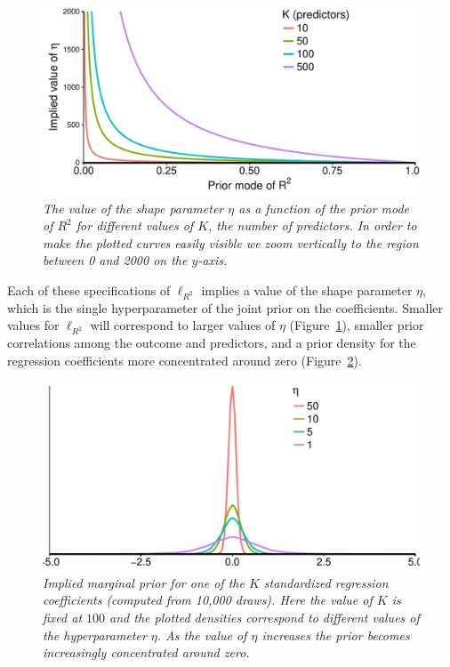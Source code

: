 \documentclass[11pt]{article}
\newcommand{\locRsq}{\ell_{R^2}}
\begin{document}
\begin{figure}
\centering
\includegraphics[width=.67\textwidth]{eta_vs_location_plot.pdf}{\vspace{-.25cm}}
\caption{\em \small The value of the shape parameter $\eta$ as a function of
the prior mode of $R^2$ for different values of $K$, the number of predictors.
In order to make the plotted curves easily visible we zoom vertically to the
region between 0 and 2000 on the $y$-axis.}
\label{fig:etavslocplot}
\end{figure}

Each of these specifications of $\locRsq$ implies a value of the shape parameter
$\eta$, which is the single hyperparameter of the joint prior on the
coefficients. Smaller values for $\locRsq$ will correspond to larger values of
$\eta$ (Figure~\ref{fig:etavslocplot}), smaller prior correlations among the
outcome and predictors, and a prior density for the regression coefficients more
concentrated around zero (Figure~\ref{fig:betaplot}).

\begin{figure}
\centering
\includegraphics[width=.67\textwidth]{betaplot.pdf}{\vspace{-.25cm}}
\caption{\em \small Implied marginal prior for one of the $K$ standardized
regression coefficients (computed from 10,000 draws). Here the value of $K$ is
fixed at $100$ and the plotted densities correspond to different values of the
hyperparameter $\eta$. As the value of $\eta$ increases the prior becomes
increasingly concentrated around zero.}
\label{fig:betaplot}
\end{figure}
\end{document}

